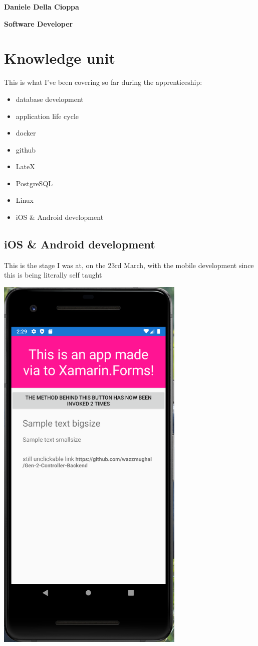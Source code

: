 \documentclass[a4paper,12pt]{article}
\begin{document}
\textbf{Daniele Della Cioppa}

\textbf{Software Developer}

\tableofcontents
\clearpage

\section{Knowledge unit}

This is what I've been covering so far during the apprenticeship:

\begin{itemize}
\item {database development}
\item {application life cycle}
\item docker
\item github 
\item LateX
\item PostgreSQL
\item Linux
\item {iOS \& Android development}
\end{itemize}
\clearpage

\subsection{iOS \& Android development}
This is the stage I was at, on the 23rd March, with the mobile development since this is being literally self taught

\includegraphics[width=9cm]{./capture-app.PNG}
\end{document}
